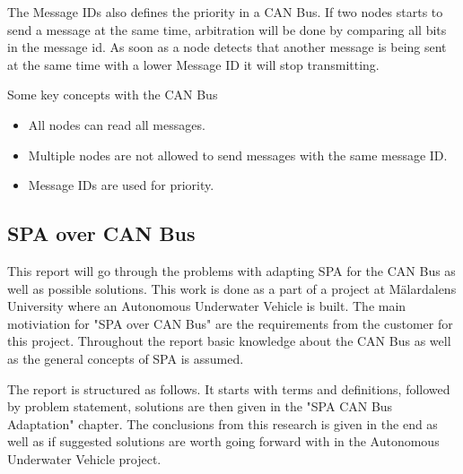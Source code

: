 The Message IDs also defines the priority in a CAN Bus. If two nodes starts to
send a message at the same time, arbitration will be done by comparing all bits
in the message id. As soon as a node detects that another message is being sent
at the same time with a lower Message ID it will stop transmitting.

Some key concepts with the CAN Bus
\begin{itemize}
    \item All nodes can read all messages.
    \item Multiple nodes are not allowed to send messages with the same message
        ID.
    \item Message IDs are used for priority.
\end{itemize}




\subsection{SPA over CAN Bus}
This report will go through the problems with adapting SPA for the CAN Bus as
well as possible solutions. This work is done as a part of a project at
M\"{a}lardalens University where an Autonomous Underwater Vehicle is built.
The main motiviation for "SPA over CAN Bus" are the requirements from the
customer for this project. Throughout the report basic knowledge about the CAN
Bus as well as the general concepts of SPA is assumed.

The report is structured as follows. It starts with terms and definitions,
followed by problem statement, solutions are then given in the "SPA CAN Bus Adaptation"
chapter. The conclusions from this research is given in the end as well as
if suggested solutions are worth going forward with in the Autonomous
Underwater Vehicle project.
